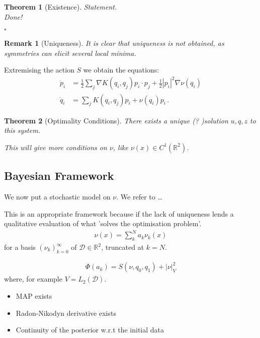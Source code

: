 \documentclass{article}
\newtheorem{theorem}{Theorem}
\newtheorem{remark}{Remark}
\begin{document}
\begin{theorem}[Existence]
Statement.\\
Done!

{\hfill $\square$}
\end{theorem}

\begin{remark}[Uniqueness]
It is clear that uniqueness is not obtained, as symmetries can elicit several
local minima.
\end{remark}

Extremising the action $S$ we obtain the equations: 
\begin{align}
\dot p_i & =\frac12 \sum_j \nabla K(q_i,q_j)p_i\cdot p_j  + \frac12 |p_i|^2 \nabla \nu(q_i)\\
\dot q_i & = \sum_j K(q_i,q_j)p_i + \nu(q_i)p_i\, . 
\end{align}

\begin{theorem}[Optimality Conditions]
There exists a unique (? )solution $u, q, z$ to this system.

This will give more conditions on $\nu$, like $\nu(x) \in C^{1}(\mathbb R^2)$. 
\end{theorem}

\subsection{Bayesian Framework}\label{sec:bayesian}

We now put a stochastic model on $\nu$. We refer to \dots

This is an appropriate framework because if the lack of uniqueness lends a
qualitative evaluation of what 'solves the optimisation problem'. 
\begin{align}
	\nu(x) = \sum_k^N a_k \nu_k(x)
\end{align}
for a basis $(\nu_k)_{k=0}^\infty$ of $\mathcal D \in \mathbb R^2$, truncated at $k=N$.  

\begin{align}
	\Phi(a_k) = S(\nu,q_0,q_1) + |\nu|_V^2
\end{align}
where, for example $ V = {L_2(\mathcal D)}$. 

\begin{itemize}
	\item MAP exists
	\item Radon-Nikodyn derivative exists
	\item Continuity of the posterior w.r.t the initial data 
\end{itemize}
\end{document}
